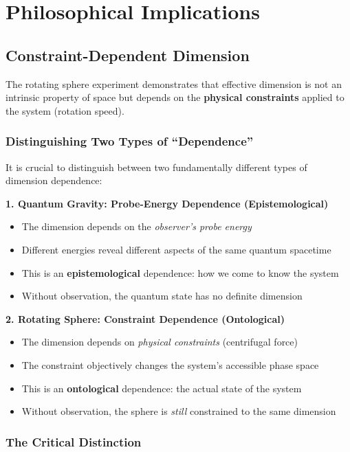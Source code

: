 \documentclass[UTF8]{ctex}\n\documentclass[12pt,a4paper]{article}
\begin{document}
\section{Philosophical Implications}
\label{sec:philosophy}

\subsection{Constraint-Dependent Dimension}

The rotating sphere experiment demonstrates that effective dimension is not an intrinsic property of space but depends on the \textbf{physical constraints} applied to the system (rotation speed).

\subsubsection{Distinguishing Two Types of ``Dependence''}

It is crucial to distinguish between two fundamentally different types of dimension dependence:

\textbf{1. Quantum Gravity: Probe-Energy Dependence (Epistemological)}
\begin{itemize}
    \item The dimension depends on the \textit{observer's probe energy}
    \item Different energies reveal different aspects of the same quantum spacetime
    \item This is an \textbf{epistemological} dependence: how we come to know the system
    \item Without observation, the quantum state has no definite dimension
\end{itemize}

\textbf{2. Rotating Sphere: Constraint Dependence (Ontological)}
\begin{itemize}
    \item The dimension depends on \textit{physical constraints} (centrifugal force)
    \item The constraint objectively changes the system's accessible phase space
    \item This is an \textbf{ontological} dependence: the actual state of the system
    \item Without observation, the sphere is \textit{still} constrained to the same dimension
\end{itemize}

\subsubsection{The Critical Distinction}
\end{document}
